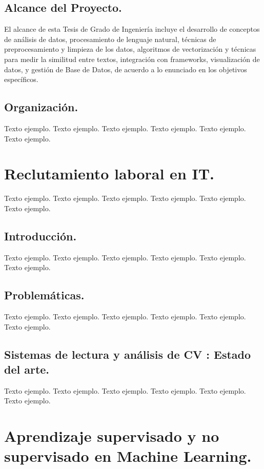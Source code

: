 \documentclass[12pt,a4paper]{article}
\begin{document}
\cleardoublepage    %

\subsection{Alcance del Proyecto.}
El alcance de esta Tesis de Grado de Ingeniería incluye el desarrollo de conceptos de análisis de datos, procesamiento de lenguaje natural, técnicas de preprocesamiento y limpieza de los datos, algoritmos de vectorización y técnicas para medir la similitud entre textos, integración con frameworks, visualización de datos, y gestión de Base de Datos, de acuerdo a lo enunciado en los objetivos específicos.

\subsection{Organización.}
Texto ejemplo. Texto ejemplo. Texto ejemplo. Texto ejemplo. Texto ejemplo. Texto ejemplo.

\section{Reclutamiento laboral en IT.}
Texto ejemplo. Texto ejemplo. Texto ejemplo. Texto ejemplo. Texto ejemplo. Texto ejemplo.

\subsection{Introducción.}
Texto ejemplo. Texto ejemplo. Texto ejemplo. Texto ejemplo. Texto ejemplo. Texto ejemplo.

\subsection{Problemáticas.}
Texto ejemplo. Texto ejemplo. Texto ejemplo. Texto ejemplo. Texto ejemplo. Texto ejemplo.

\subsection{Sistemas de lectura y análisis de CV : Estado del arte.}
Texto ejemplo. Texto ejemplo. Texto ejemplo. Texto ejemplo. Texto ejemplo. Texto ejemplo.

\section{Aprendizaje supervisado y no supervisado en Machine Learning.}
\end{document}
